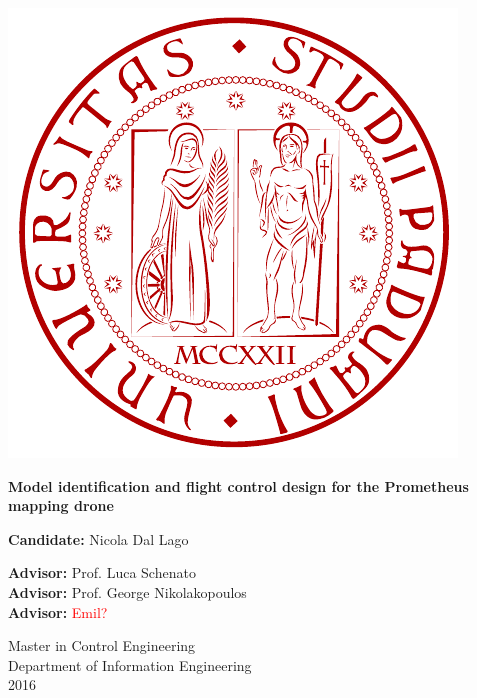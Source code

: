 \documentclass[11pt, a4paper, onecolumn, fleqn, twoside, titlepage, openright]{book}
\begin{document}
	\renewcommand{\thepage}{\roman{page}} 		%

	\thispagestyle{empty}

	\begin{center}
	    \begin{minipage}{0.75\linewidth}
	        \centering
	        \includegraphics[width=0.5\linewidth]{images/logo_unipd.pdf}
	        \vspace{3cm}
	    
	        {\Large \textbf{Model identification and flight control design for the Prometheus mapping drone} \par}
	        \vspace{3cm}
	    
	        \hspace{5cm}
	        \textbf{Candidate:} Nicola Dal Lago
	        \vspace{3cm}

	        \justifying
	        \noindent
	        \hspace{-2cm}\textbf{Advisor:} Prof. Luca Schenato \\
	        \hspace*{-2cm}\textbf{Advisor:} Prof. George Nikolakopoulos \\
	        \hspace*{-2cm}\textbf{Advisor:} \textcolor{red}{Emil?}
	        \vspace{3cm}

	        \centering
	        \noindent
	        Master in Control Engineering \\
	        Department of Information Engineering \\ 
	        2016
	        
	    \end{minipage}
	\end{center}
\end{document}
